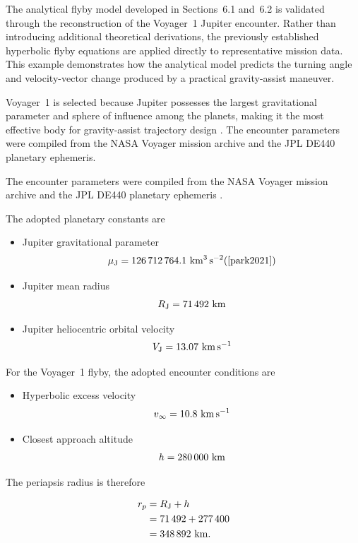 \documentclass[11pt,a4paper]{article}
\begin{document}
The analytical flyby model developed in Sections~6.1 and~6.2 is validated through the reconstruction of the Voyager~1 Jupiter encounter. Rather than introducing additional theoretical derivations, the previously established hyperbolic flyby equations are applied directly to representative mission data. This example demonstrates how the analytical model predicts the turning angle and velocity-vector change produced by a practical gravity-assist maneuver.

Voyager~1 is selected because Jupiter possesses the largest gravitational parameter and sphere of influence among the planets, making it the most effective body for gravity-assist trajectory design \cite{curtis2020}. The encounter parameters were compiled from the NASA Voyager mission archive and the JPL DE440 planetary ephemeris.

The encounter parameters were compiled from the NASA Voyager mission archive \cite{voyager1} and the JPL DE440 planetary ephemeris \cite{park2021}.

The adopted planetary constants are

\begin{itemize}
    \item Jupiter gravitational parameter
    \[
        \mu_{\rm J}=126\,712\,764.1\ {\rm km^3\,s^{-2}} ( \cite{park2021})
    \]

    \item Jupiter mean radius
    \[
        R_{\rm J}=71\,492\ {\rm km}
    \]

    \item Jupiter heliocentric orbital velocity
    \[
        V_{\rm J}=13.07\ {\rm km\,s^{-1}}
    \]
\end{itemize}

For the Voyager~1 flyby, the adopted encounter conditions are

\begin{itemize}
    \item Hyperbolic excess velocity
    \[
        v_\infty=10.8\ {\rm km\,s^{-1}}
    \]

    \item Closest approach altitude
    \[
        h=280\,000\ {\rm km}
    \]
\end{itemize}

The periapsis radius is therefore

\begin{align}
r_p
&=R_{\rm J}+h
\nonumber\\
&=71\,492+277\,400
\nonumber\\
&=348\,892\ {\rm km}.
\end{align}
\end{document}
